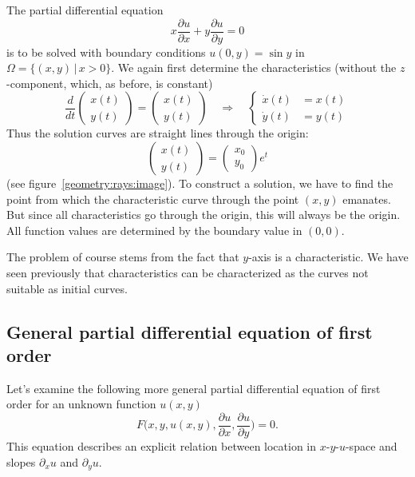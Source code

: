 The partial differential equation
\begin{equation}
x\frac{\partial u}{\partial x}
+
y\frac{\partial u}{\partial y}
=0
\label{geometry:rays}
\end{equation}
is to be solved with boundary conditions
$u(0,y)=\sin y$
in $\Omega=\{(x,y)\,|\, x>0\}$.
We again first determine the characteristics (without the $z$-component,
which, as before, is constant)
\[
\frac{d}{dt}
\begin{pmatrix}
x(t)\\y(t)
\end{pmatrix}
=
\begin{pmatrix}
x(t)\\y(t)
\end{pmatrix}
\quad
\Rightarrow
\quad
\left\{
\begin{aligned}
\dot x(t)&=x(t)\\
\dot y(t)&=y(t)
\end{aligned}
\right.
\]
Thus the solution curves are straight lines through the origin:
\[
\begin{pmatrix}
x(t)\\y(t)
\end{pmatrix}
=\begin{pmatrix}x_0\\y_0\end{pmatrix}e^t
\]
(see figure~\ref{geometry:rays:image}).
To construct a solution, we have to find the point from which the 
characteristic curve through the point $(x,y)$ emanates.
But since all characteristics go through the origin, this will always
be the origin.
All function values are determined by the boundary value in $(0,0)$.

The problem of course stems from the fact that $y$-axis is a characteristic.
We have seen previously that characteristics can be characterized as the
curves not suitable as initial curves.

\subsection{General partial differential equation of first order}
Let's examine the following more general partial differential equation of first
order for an unknown function $u(x,y)$
\begin{equation}
F\biggl(
x,y,u(x,y),\frac{\partial u}{\partial x},\frac{\partial u}{\partial y}
\biggr)=0.
\label{skript:generalpde}
\end{equation}
This equation describes an explicit relation between location in
$x$-$y$-$u$-space and slopes 
$\partial_xu$ and $\partial_yu$.


